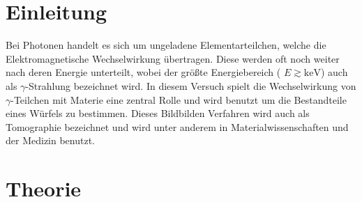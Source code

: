 \section{Einleitung}
Bei Photonen handelt es sich um  ungeladene Elementarteilchen, welche die Elektromagnetische Wechselwirkung übertragen. Diese werden oft noch weiter nach deren Energie unterteilt, wobei der größte Energiebereich ( $E \gtrsim \si{\keV}$) auch als $\gamma$-Strahlung bezeichnet wird.
In diesem Versuch spielt die Wechselwirkung von $\gamma$-Teilchen mit Materie eine zentral Rolle und wird benutzt um die Bestandteile eines Würfels zu bestimmen. Dieses Bildbilden Verfahren wird auch als Tomographie bezeichnet und wird unter anderem in Materialwissenschaften und der Medizin benutzt.
\section{Theorie}
